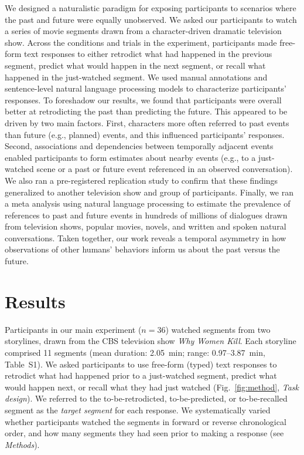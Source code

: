 \documentclass[10pt]{article}
\newcommand{\stimDescription}{S1}
\begin{document}
We designed a naturalistic paradigm for exposing participants to scenarios where the past and future were equally unobserved. We asked our participants to watch a series of movie segments drawn from a character-driven dramatic television show. Across the conditions and trials in the experiment, participants made free-form text responses to either retrodict what had happened in the previous segment, predict what would happen in the next segment, or recall what happened in the just-watched segment. We used manual annotations and sentence-level natural language processing models to characterize participants' responses. To foreshadow our results, we found that participants were overall better at retrodicting the past than predicting the future. This appeared to be driven by two main factors. First, characters more often referred to past events than future (e.g., planned) events, and this influenced participants' responses. Second, associations and dependencies between temporally adjacent events enabled participants to form estimates about nearby events (e.g., to a just-watched scene or a past or future event referenced in an observed conversation). We also ran a pre-registered replication study to confirm that these findings generalized to another television show and group of participants. Finally, we ran a meta analysis using natural language processing to estimate the prevalence of references to past and future events in hundreds of millions of dialogues drawn from television shows, popular movies, novels, and written and spoken natural conversations. Taken together, our work reveals a temporal asymmetry in how observations of other humans’ behaviors inform us about the past versus the future.

\section*{Results}

Participants in our main experiment ($n = 36$) watched segments from two storylines, drawn from the CBS television show \textit{Why Women Kill}. Each storyline comprised 11 segments (mean duration: 2.05~min; range: 0.97--3.87~min, Table~\stimDescription). We asked participants to use free-form (typed) text responses to retrodict what had happened prior to a just-watched segment, predict what would happen next, or recall what they had just watched (Fig.~\ref{fig:method}, \textit{Task design}). We referred to the to-be-retrodicted, to-be-predicted, or to-be-recalled segment as the \textit{target segment} for each response. We systematically varied whether participants watched the segments in forward or reverse chronological order, and how many segments they had seen prior to making a response (see \textit{Methods}).
\end{document}
